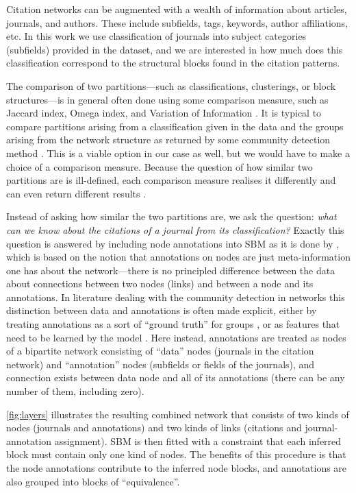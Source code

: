 \documentclass[a4paper,12pt]{article}
\begin{document}
Citation networks can be augmented with a wealth of information about articles, journals, and authors. 
These include subfields, tags, keywords, author affiliations, etc. 
In this work we use classification of journals into subject categories (subfields) provided in the dataset, and we are interested in how 
much does this classification correspond to the structural blocks found in the citation patterns.

The comparison of two partitions---such as classifications, clusterings, or block structures---is in general often 
done using some comparison measure, such as Jaccard index, 
Omega index, and Variation of Information \citep{Meila2007}.
It is typical to compare partitions arising from a classification given in the data and the groups arising from the network structure 
as returned by some community detection 
method \citep{Bommarito2010,Chen2010,Lancichinetti_comparison_2009,Hric2014,Yang2015}. This 
is a viable option in our case as well, but we would have to make a choice of a comparison measure.
Because the question of how similar two partitions are is ill-defined, each comparison measure
realises it differently and can even return different results \citep{Meila2007,Traud2011,Fortunato2016Community}.

Instead of asking how similar the two partitions are, 
we ask the question:
\emph{what can we know about the citations of a journal from its classification?}
Exactly this question is answered by including node annotations into SBM as it is done by \citet{Hric2016}, which
is based on the notion that annotations on nodes are just meta-information 
one has about the network---there is no principled difference between the data about 
connections between two nodes (links) and between a node and its annotations. In 
literature dealing with the community detection in networks this distinction
between data and annotations is often made explicit, 
either by treating annotations as a sort of ``ground truth'' for 
groups \citep{yang_community-affiliation_2012,yang_structure_2012,Yang2015},
or as features that need to be learned by the 
model \citep{Newman2016}. Here instead, annotations are treated as nodes of a bipartite 
network consisting of ``data'' nodes (journals in the citation network) and ``annotation'' 
nodes (subfields or fields of the journals), and connection exists between data node and all of its 
annotations (there can be any number of them, including zero).

\cref{fig:layers} illustrates the resulting combined network that consists of two kinds of nodes (journals and annotations)
and two kinds of links (citations and journal-annotation assignment).
SBM is then fitted with a constraint that each inferred block must contain only one kind of nodes.
The benefits of this procedure is that the node annotations contribute to the inferred node blocks,
and annotations are also grouped into blocks of ``equivalence''.
\end{document}
